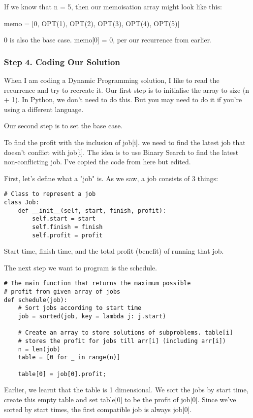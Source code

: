 \documentclass{article}
\begin{document}
If we know that n = 5, then our memoisation array might look like this:

memo = [0, OPT(1), OPT(2), OPT(3), OPT(4), OPT(5)]

0 is also the base case. memo[0] = 0, per our recurrence from earlier.

\newpage
\subsubsection{Step 4. Coding Our Solution}
When I am coding a Dynamic Programming solution, I like to read the recurrence and try to recreate it. Our first step is to initialise the array to size (n + 1). In Python, we don't need to do this. But you may need to do it if you're using a different language.

Our second step is to set the base case. 

To find the profit with the inclusion of job[i]. we need to find the latest job that doesn’t conflict with job[i].  The idea is to use Binary Search to find the latest non-conflicting job. I've copied the code from here but edited.

First, let's define what a "job" is. As we saw, a job consists of 3 things:
\begin{verbatim}
# Class to represent a job 
class Job: 
	def __init__(self, start, finish, profit): 
		self.start = start 
		self.finish = finish 
		self.profit = profit 
\end{verbatim}
Start time, finish time, and the total profit (benefit) of running that job.

The next step we want to program is the schedule.
\begin{verbatim}
# The main function that returns the maximum possible 
# profit from given array of jobs
def schedule(job): 
	# Sort jobs according to start time 
	job = sorted(job, key = lambda j: j.start) 

	# Create an array to store solutions of subproblems. table[i] 
	# stores the profit for jobs till arr[i] (including arr[i]) 
	n = len(job) 
	table = [0 for _ in range(n)] 

	table[0] = job[0].profit;
\end{verbatim}
Earlier, we learnt that the table is 1 dimensional. We sort the jobs by start time, create this empty table and set table[0] to be the profit of job[0]. Since we've sorted by start times, the first compatible job is always job[0].
\end{document}
